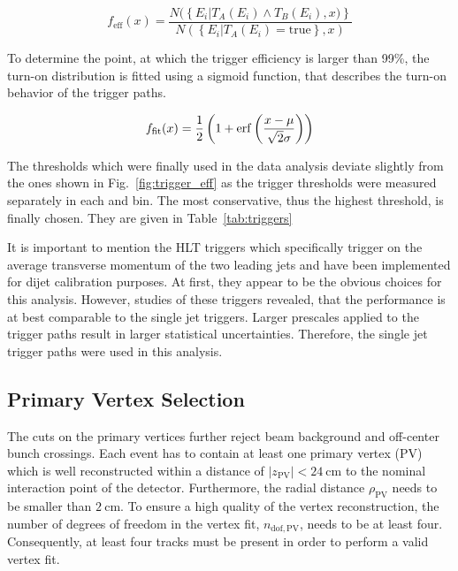 \begin{equation}
\label{eq:trigger_eff}
    f_{\mathrm{eff}} (x) = \frac{N(\left\{E_i|T_A(E_i) \wedge T_B(E_i), x)\right\}}{N(\left\{ E_i | T_A(E_i) = \mathrm{true} \right\} , x)}
\end{equation}

To determine the point, at which the trigger efficiency is larger than 99\%, the
turn-on distribution is fitted using a sigmoid function, that describes the
turn-on behavior of the trigger paths.

\begin{equation}
\label{eq:trigger_eff_fit}
    f_{\mathrm{fit}} (x) = \frac{1}{2} \left( 1 + \operatorname{erf} \left(\frac{x-\mu}{\sqrt{2}\sigma}\right)\right)
\end{equation}

The thresholds which were finally used in the data analysis deviate slightly
from the ones shown in Fig.~\ref{fig:trigger_eff} as the trigger thresholds
were measured separately in each \ystar and \yboost bin. The most
conservative, thus the highest threshold, is finally chosen. They are given in
Table~\ref{tab:triggers}

It is important to mention the HLT triggers which specifically trigger on the
average transverse momentum of the two leading jets and have been implemented
for dijet calibration purposes. At first, they appear to be the obvious choices
for this analysis. However, studies of these triggers revealed, that the
performance is at best comparable to the single jet triggers. Larger prescales
applied to the \ptavg trigger paths result in larger statistical uncertainties.
Therefore, the single jet trigger paths were used in this analysis.

\subsection{Primary Vertex Selection}

The cuts on the primary vertices further reject beam background and off-center bunch
crossings. Each event has to contain at least one primary vertex (PV) which is well
reconstructed within a distance of $|z_\mathrm{PV}| < \SI{24}{\centi \meter}$ to
the nominal interaction point of the detector. Furthermore, the radial distance
$\rho_\mathrm{PV}$ needs to be smaller than $\SI{2}{\centi\meter}$. To
ensure a high quality of the vertex reconstruction, the number of
degrees of freedom in the vertex fit, $n_{\mathrm{dof,PV}}$, needs to be at least
four. Consequently, at least four tracks must be present in order to
perform a valid vertex fit.

